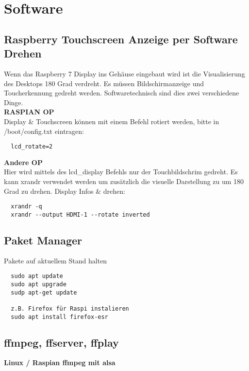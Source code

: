\newpage
\section{Software}

\subsection{Raspberry Touchscreen Anzeige per Software Drehen}
Wenn das Raspberry 7\grqq{} Display ins Gehäuse eingebaut wird ist die 
Visualisierung des Desktops 180 Grad verdreht. Es müssen Bildschirmanzeige 
und Toucherkennung gedreht werden. Softwaretechnisch sind dies zwei verschiedene 
Dinge.\\

\textbf{RASPIAN OP}\\
Display \& Touchscreen können mit einem Befehl rotiert werden, 
bitte in /boot/config.txt eintragen:
\begin{verbatim}
  lcd_rotate=2
\end{verbatim}

\textbf{Andere OP}\\
Hier wird mittels des lcd\_display Befehls nur der Touchbildschrim 
gedreht. Es kann xrandr verwendet werden um zusätzlich die visuelle Darstellung zu 
um 180 Grad zu drehen. Display Infos \& drehen:
\begin{verbatim}
  xrandr -q
  xrandr --output HDMI-1 --rotate inverted
\end{verbatim}

\subsection{Paket Manager}
Pakete auf aktuellem Stand halten
\begin{verbatim}
  sudo apt update
  sudo apt upgrade
  sudp apt-get update

  z.B. Firefox für Raspi instalieren
  sudo apt install firefox-esr
\end{verbatim}

\subsection{ffmpeg, ffserver, ffplay}

\textbf{Linux / Raspian ffmpeg mit alsa} %

